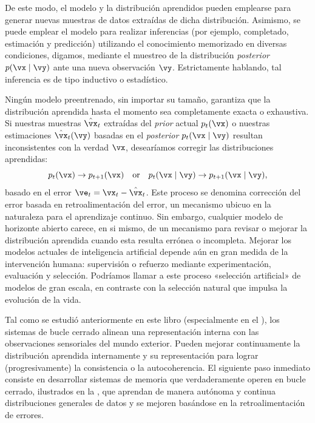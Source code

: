 \documentclass[../../book-main_es.tex]{subfiles}
\begin{document}
De este modo, el modelo y la distribución aprendidos pueden emplearse para generar nuevas 
muestras de datos extraídas de dicha distribución. Asimismo, se puede emplear el modelo para 
realizar inferencias (por ejemplo, completado, estimación y predicción) utilizando el 
conocimiento memorizado en diversas condiciones, digamos, mediante el muestreo de la 
distribución \textit{posterior} \(p(\vx\mid \vy)\) ante una nueva observación \(\vy\).
Estrictamente hablando, tal inferencia es de tipo inductivo o estadístico.

Ningún modelo preentrenado, sin importar su tamaño, garantiza que la distribución aprendida 
hasta el momento sea completamente exacta o exhaustiva. Si nuestras muestras \(\hat{\vx}_{t}\)
extraídas del \textit{prior} actual \(p_{t}(\vx)\) o nuestras estimaciones \(\hat{\vx}_{t}(\vy)\) 
basadas en el \textit{posterior} \(p_{t}(\vx\mid \vy)\) resultan inconsistentes con la verdad 
\(\vx\), desearíamos corregir las distribuciones aprendidas:
\begin{equation}
    p_{t}(\vx) \rightarrow p_{t+1}(\vx) \quad \text{or}\quad
    p_{t}(\vx\mid \vy) \rightarrow p_{t+1}(\vx\mid \vy),
\end{equation}
basado en el error \(\ve_{t} = \vx_{t} - \hat{\vx}_{t}\). 
Este proceso se denomina corrección del error basada en retroalimentación del error, un 
mecanismo ubicuo en la naturaleza para el aprendizaje continuo. Sin embargo, cualquier 
modelo de horizonte abierto carece, en si mismo, de un mecanismo para revisar o 
mejorar la distribución aprendida cuando esta resulta errónea o incompleta.
Mejorar los modelos actuales de inteligencia artificial depende aún en gran medida 
de la intervención humana: supervisión o refuerzo mediante experimentación, evaluación 
y selección. Podríamos llamar a este proceso «selección artificial» de modelos de gran escala, 
en contraste con la selección natural que impulsa la evolución de la vida.

Tal como se estudió anteriormente en este libro (especialmente en el 
), los sistemas de bucle cerrado alinean una 
representación interna con las observaciones sensoriales del mundo exterior. Pueden 
mejorar continuamente la distribución aprendida internamente y su representación para 
lograr (progresivamente) la consistencia o la autocoherencia. El siguiente paso 
inmediato consiste en desarrollar sistemas de memoria que verdaderamente operen en bucle cerrado, 
ilustrados en la , que aprendan de manera autónoma y continua 
distribuciones generales de datos y se mejoren basándose en la 
retroalimentación de errores. 
\end{document}
